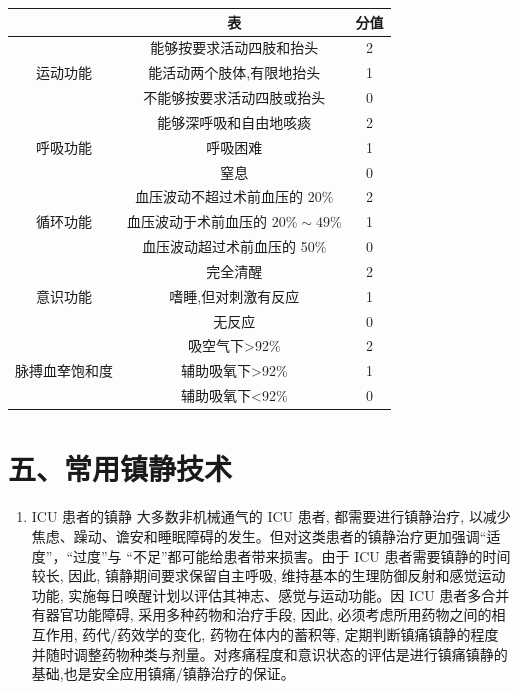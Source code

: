 \documentclass[10pt]{article}
\begin{document}
\begin{center}
\begin{tabular}{|c|c|c|}
\hline
 & 表 & 分值 \\
\hline
\multirow[t]{3}{*}{运动功能} & 能够按要求活动四肢和抬头 & 2 \\
\hline
 & 能活动两个肢体,有限地抬头 & 1 \\
\hline
 & 不能够按要求活动四肢或抬头 & 0 \\
\hline
\multirow[t]{3}{*}{呼吸功能} & 能够深呼吸和自由地咳痰 & 2 \\
\hline
 & 呼吸困难 & 1 \\
\hline
 & 窒息 & 0 \\
\hline
\multirow[t]{3}{*}{循环功能} & 血压波动不超过术前血压的 $20 \%$ & 2 \\
\hline
 & 血压波动于术前血压的 $20 \% \sim 49 \%$ & 1 \\
\hline
 & 血压波动超过术前血压的 50\% & 0 \\
\hline
\multirow[t]{3}{*}{意识功能} & 完全清醒 & 2 \\
\hline
 & 嗜睡,但对刺激有反应 & 1 \\
\hline
 & 无反应 & 0 \\
\hline
\multirow[t]{3}{*}{脉搏血羍饱和度} & 吸空气下>92\% & 2 \\
\hline
 & 辅助吸氧下>92\% & 1 \\
\hline
 & 辅助吸氧下<92\% & 0 \\
\hline
\end{tabular}
\end{center}

\section*{五、常用镇静技术}
\begin{enumerate}
  \item ICU 患者的镇静 大多数非机械通气的 ICU 患者, 都需要进行镇静治疗, 以减少焦虑、躁动、谵安和睡眠障碍的发生。但对这类患者的镇静治疗更加强调“适度”，“过度”与 “不足”都可能给患者带来损害。由于 ICU 患者需要镇静的时间较长, 因此, 镇静期间要求保留自主呼吸, 维持基本的生理防御反射和感觉运动功能, 实施每日唤醒计划以评估其神志、感觉与运动功能。因 ICU 患者多合并有器官功能障碍, 采用多种药物和治疗手段, 因此, 必须考虑所用药物之间的相互作用, 药代/药效学的变化, 药物在体内的蓄积等, 定期判断镇痛镇静的程度并随时调整药物种类与剂量。对疼痛程度和意识状态的评估是进行镇痛镇静的基础,也是安全应用镇痛/镇静治疗的保证。
\end{enumerate}
\end{document}

